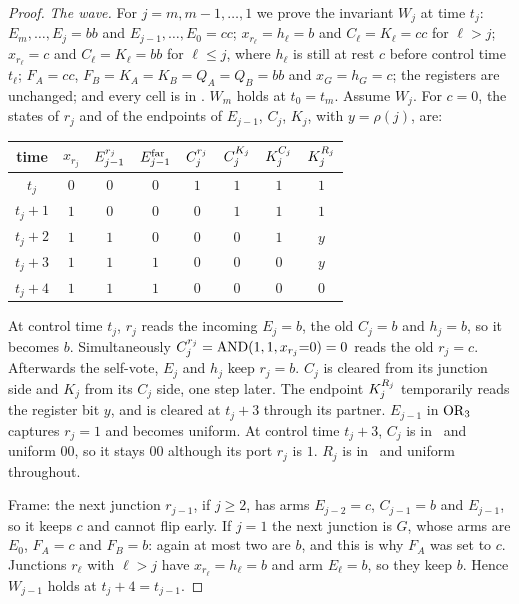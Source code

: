 \begin{proof}
\emph{The wave.} For $j=m,m-1,\dots,1$ we prove the invariant $W_j$ at time $t_j$:
$E_m,\dots,E_j=bb$ and $E_{j-1},\dots,E_0=cc$; $x_{r_\ell}=h_\ell=b$ and $C_\ell=K_\ell=cc$ for
$\ell>j$; $x_{r_\ell}=c$ and $C_\ell=K_\ell=bb$ for $\ell\le j$, where $h_\ell$ is still at rest
$c$ before control time $t_\ell$; $F_A=cc$,
$F_B=K_A=K_B=Q_A=Q_B=bb$ and $x_G=h_G=c$; the registers are unchanged; and every cell is in \HOLD.
$W_m$ holds at $t_0=t_m$. Assume $W_j$. For $c=0$, the states of $r_j$ and of the endpoints of
$E_{j-1}$, $C_j$, $K_j$, with $y=\rho(j)$, are:
\begin{center}\small
\begin{tabular}{cccccccc}\toprule
time & $x_{r_j}$ & $E_{j-1}^{r_j}$ & $E_{j-1}^{\mathrm{far}}$ & $C_j^{r_j}$ & $C_j^{K_j}$ & $K_j^{C_j}$ & $K_j^{R_j}$\\\midrule
$t_j$   & $0$ & $0$ & $0$ & $1$ & $1$ & $1$ & $1$\\
$t_j+1$ & $1$ & $0$ & $0$ & $0$ & $1$ & $1$ & $1$\\
$t_j+2$ & $1$ & $1$ & $0$ & $0$ & $0$ & $1$ & $y$\\
$t_j+3$ & $1$ & $1$ & $1$ & $0$ & $0$ & $0$ & $y$\\
$t_j+4$ & $1$ & $1$ & $1$ & $0$ & $0$ & $0$ & $0$\\\bottomrule
\end{tabular}
\end{center}
At control time $t_j$, $r_j$ reads the incoming $E_j=b$, the old $C_j=b$ and $h_j=b$, so it becomes
$b$. Simultaneously $C_j^{r_j}=\operatorname{AND}(1,1,x_{r_j}{=}0)=0$ reads the old $r_j=c$. Afterwards the
self-vote, $E_j$ and $h_j$ keep $r_j=b$. $C_j$ is cleared from its junction side and $K_j$ from its
$C_j$ side, one step later. The endpoint $K_j^{R_j}$ temporarily reads the register bit $y$, and is
cleared at $t_j+3$ through its partner. $E_{j-1}$ in $\operatorname{OR}_3$ captures $r_j=1$ and becomes uniform. At
control time $t_j+3$, $C_j$ is in \HOLD\ and uniform $00$, so it stays $00$ although its port $r_j$ is
$1$. $R_j$ is in \HOLD\ and uniform throughout.

Frame: the next junction $r_{j-1}$, if $j\ge 2$, has arms $E_{j-2}=c$, $C_{j-1}=b$ and $E_{j-1}$, so
it keeps $c$ and cannot flip early. If $j=1$ the next junction is $G$, whose arms are $E_0$, $F_A=c$
and $F_B=b$: again at most two are $b$, and this is why $F_A$ was set to $c$. Junctions $r_\ell$ with
$\ell>j$ have $x_{r_\ell}=h_\ell=b$ and arm $E_\ell=b$, so they keep $b$. Hence $W_{j-1}$ holds at
$t_j+4=t_{j-1}$.


\end{proof}
